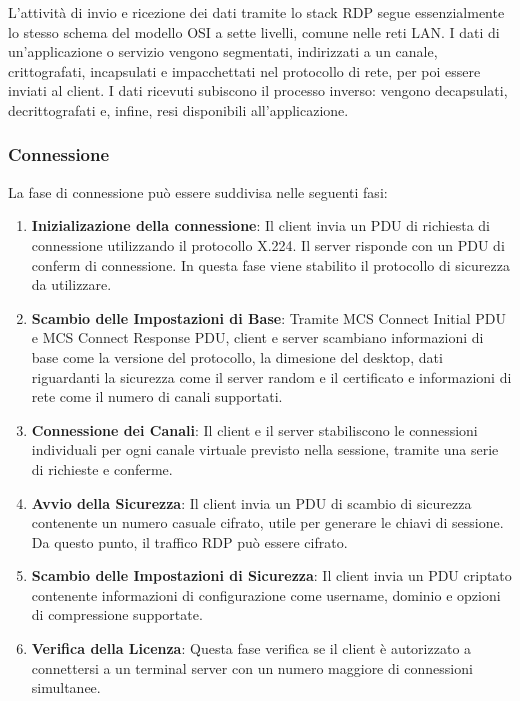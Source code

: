 \documentclass[12pt,a4paper,openright,twoside]{book}
\begin{document}
L'attività di invio e ricezione dei dati tramite lo stack \ac{RDP} segue essenzialmente lo stesso schema del modello OSI a sette livelli,
comune nelle reti \ac{LAN}.
%
I dati di un'applicazione o servizio vengono segmentati,
indirizzati a un canale, crittografati,
incapsulati e impacchettati nel protocollo di rete, per poi essere inviati al client.
%
I dati ricevuti subiscono il processo inverso: vengono decapsulati, decrittografati e, infine, resi disponibili all'applicazione. \cite{microsoftrdp}

\subsubsection{Connessione}

La fase di connessione può essere suddivisa nelle seguenti fasi:
\begin{enumerate}
    \item \textbf{Inizializazione della connessione}: Il client invia un \ac{PDU} di richiesta di connessione utilizzando il protocollo X.224. Il server risponde con un \ac{PDU} di conferm di connessione.
    In questa fase viene stabilito il protocollo di sicurezza da utilizzare.
    \item \textbf{Scambio delle Impostazioni di Base}: Tramite MCS Connect Initial \ac{PDU} e MCS Connect Response \ac{PDU},
    client e server scambiano informazioni di base come la versione del protocollo, la dimesione del desktop,
    dati riguardanti la sicurezza come il server random e il certificato e informazioni di rete come il numero di canali supportati.
    \item \textbf{Connessione dei Canali}: Il client e il server stabiliscono le connessioni individuali per ogni canale virtuale previsto nella sessione,
    tramite una serie di richieste e conferme.
    \item \textbf{Avvio della Sicurezza}: Il client invia un \ac{PDU} di scambio di sicurezza contenente un numero casuale cifrato, utile per generare le chiavi di sessione.
    Da questo punto, il traffico \ac{RDP} può essere cifrato.
    \item \textbf{Scambio delle Impostazioni di Sicurezza}: Il client invia un \ac{PDU} criptato contenente informazioni di configurazione come username,
    dominio e opzioni di compressione supportate.
    \item \textbf{Verifica della Licenza}: Questa fase verifica se il client è autorizzato a connettersi a un terminal server con un numero maggiore di connessioni simultanee.

\end{enumerate}
\end{document}
